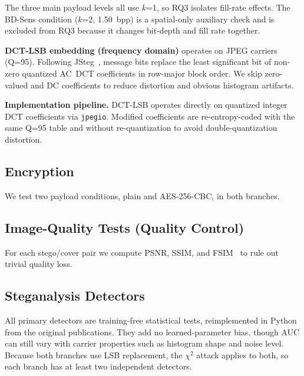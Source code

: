 \documentclass[10pt,twocolumn,a4paper]{article}
\begin{document}
\noindent The three main payload levels all use $k$=1, so RQ3 isolates fill-rate effects. The BD-Sens condition ($k$=2, 1.50~bpp) is a spatial-only auxiliary check and is excluded from RQ3 because it changes bit-depth and fill rate together.

\textbf{DCT-LSB embedding (frequency domain)} operates on JPEG carriers (Q=95). Following JSteg~\cite{westfeld1999chi,fridrich2003calib}, message bits replace the least significant bit of non-zero quantized AC~DCT coefficients in row-major block order. We skip zero-valued and DC coefficients to reduce distortion and obvious histogram artifacts.

\textbf{Implementation pipeline.} DCT-LSB operates directly on quantized integer DCT coefficients via \texttt{jpegio}. Modified coefficients are re-entropy-coded with the same Q=95 table and without re-quantization to avoid double-quantization distortion.

\subsection{Encryption}

We test two payload conditions, plain and AES-256-CBC, in both branches.

\subsection{Image-Quality Tests (Quality Control)}

For each stego/cover pair we compute PSNR, SSIM, and FSIM~\cite{zhang2011fsim} to rule out trivial quality loss.

\subsection{Steganalysis Detectors}

All primary detectors are training-free statistical tests, reimplemented in Python from the original publications. They add no learned-parameter bias, though AUC can still vary with carrier properties such as histogram shape and noise level. Because both branches use LSB replacement, the $\chi^2$ attack applies to both, so each branch has at least two independent detectors.
\end{document}
